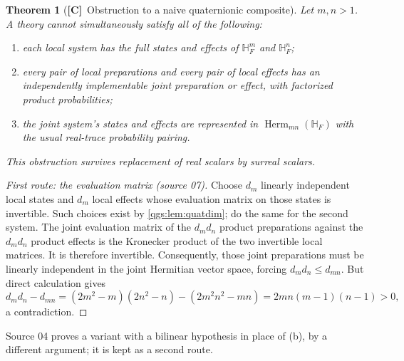 \documentclass[11pt,oneside]{article}
\numberwithin{equation}{section}
\theoremstyle{plain}
\newtheorem{theorem}{Theorem}[section]
\theoremstyle{definition}
\theoremstyle{remark}
\newcommand{\HF}{\mathbb H_F}
\DeclareMathOperator{\Herm}{Herm}
\newcommand{\TC}{\textcolor{TierC}{\textsf{\bfseries[C]}}}
\begin{document}
\begin{theorem}[\TC\ Obstruction to a naive quaternionic composite]\label{qgs:thm:quatcomposite}
Let $m,n>1$. A theory cannot simultaneously satisfy all of the following:
\begin{enumerate}[label=\textup{(\alph*)},leftmargin=2em,itemsep=2pt]
\item each local system has the full states and effects of $\HF^m$ and $\HF^n$;
\item every pair of local preparations and every pair of local effects has an independently implementable joint preparation or effect, with factorized product probabilities;
\item the joint system's states and effects are represented in $\Herm_{mn}(\HF)$ with the usual real-trace probability pairing.
\end{enumerate}
This obstruction survives replacement of real scalars by surreal scalars.
\end{theorem}
\begin{proof}[First route: the evaluation matrix (source 07)]
Choose $d_m$ linearly independent local states and $d_m$ local effects whose evaluation matrix on those states is invertible. Such choices exist by \cref{qgs:lem:quatdim}; do the same for the second system. The joint evaluation matrix of the $d_md_n$ product preparations against the $d_md_n$ product effects is the Kronecker product of the two invertible local matrices. It is therefore invertible. Consequently, those joint preparations must be linearly independent in the joint Hermitian vector space, forcing $d_md_n\le d_{mn}$. But direct calculation gives
\begin{equation}\label{qgs:eq:quatdimensiongap}
 d_m d_n-d_{mn}=(2m^2-m)(2n^2-n)-(2m^2n^2-mn)=2mn(m-1)(n-1)>0,
\end{equation}
a contradiction.
\end{proof}

Source 04 proves a variant with a bilinear hypothesis in place of (b), by a different argument; it is kept as a second route.
\end{document}

